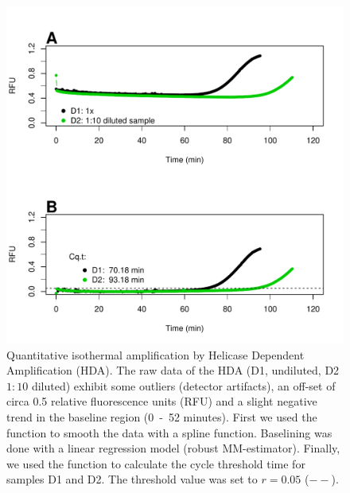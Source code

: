 \begin{figure}[htbp]
  \centering
  \includegraphics[clip=true, width=14cm]{figures/qIA.pdf}
  \caption{Quantitative isothermal amplification by Helicase Dependent 
Amplification (HDA).  The raw data of the HDA (D1, undiluted, D2 
$1:10$ diluted) exhibit some outliers (detector artifacts), an off-set of circa 
0.5 relative fluorescence units (RFU) and a slight negative trend in the 
baseline region (0~-~52 minutes).  First we used the  
function to smooth the data with a spline function. Baselining was done with a 
linear regression model (robust MM-estimator). Finally, we used the 
 function to calculate the cycle threshold time for samples D1 and 
D2. The threshold value was set to $r = 0.05$ ($--$).}
  \label{figure:qIA}
\end{figure}

